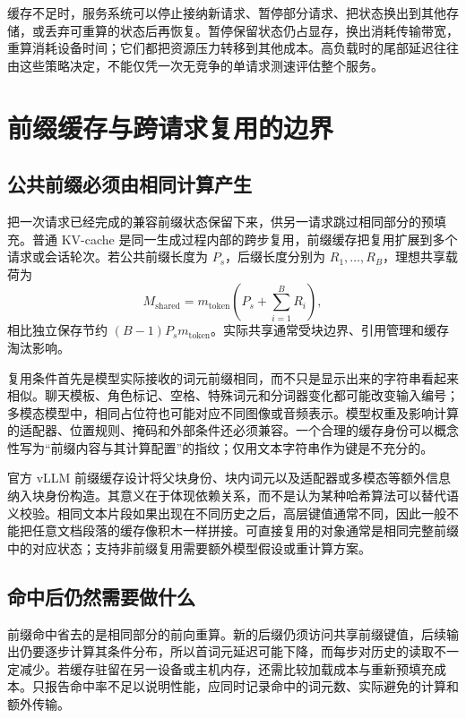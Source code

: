\documentclass[UTF8,12pt,a4paper,fontset=fandol]{ctexart}
\begin{document}
缓存不足时，服务系统可以停止接纳新请求、暂停部分请求、把状态换出到其他存储，或丢弃可重算的状态后再恢复。暂停保留状态仍占显存，换出消耗传输带宽，重算消耗设备时间；它们都把资源压力转移到其他成本。高负载时的尾部延迟往往由这些策略决定，不能仅凭一次无竞争的单请求测速评估整个服务。

\section{前缀缓存与跨请求复用的边界}
\label{sec:kv-prefix-sharing}

\subsection{公共前缀必须由相同计算产生}

把一次请求已经完成的兼容前缀状态保留下来，供另一请求跳过相同部分的预填充。普通 KV-cache 是同一生成过程内部的跨步复用，前缀缓存把复用扩展到多个请求或会话轮次。若公共前缀长度为 $P_s$，后缀长度分别为 $R_1,\ldots,R_B$，理想共享载荷为
\begin{equation}
 M_{\mathrm{shared}}=m_{\mathrm{token}}
 \left(P_s+\sum_{i=1}^{B}R_i\right),
 \label{eq:kv-prefix-memory}
\end{equation}
相比独立保存节约 $(B-1)P_sm_{\mathrm{token}}$。实际共享通常受块边界、引用管理和缓存淘汰影响。

复用条件首先是模型实际接收的词元前缀相同，而不只是显示出来的字符串看起来相似。聊天模板、角色标记、空格、特殊词元和分词器变化都可能改变输入编号；多模态模型中，相同占位符也可能对应不同图像或音频表示。模型权重及影响计算的适配器、位置规则、掩码和外部条件还必须兼容。一个合理的缓存身份可以概念性写为“前缀内容与其计算配置”的指纹；仅用文本字符串作为键是不充分的。

官方 vLLM 前缀缓存设计将父块身份、块内词元以及适配器或多模态等额外信息纳入块身份构造\cite{vllm-prefix}。其意义在于体现依赖关系，而不是认为某种哈希算法可以替代语义校验。相同文本片段如果出现在不同历史之后，高层键值通常不同，因此一般不能把任意文档段落的缓存像积木一样拼接。可直接复用的对象通常是相同完整前缀中的对应状态；支持非前缀复用需要额外模型假设或重计算方案。

\subsection{命中后仍然需要做什么}

前缀命中省去的是相同部分的前向重算。新的后缀仍须访问共享前缀键值，后续输出仍要逐步计算其条件分布，所以首词元延迟可能下降，而每步对历史的读取不一定减少。若缓存驻留在另一设备或主机内存，还需比较加载成本与重新预填充成本。只报告命中率不足以说明性能，应同时记录命中的词元数、实际避免的计算和额外传输。
\end{document}
